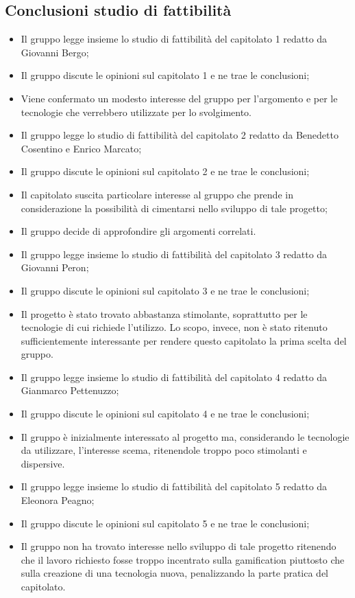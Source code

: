 \documentclass[11pt,a4paper]{article}
\begin{document}
	\subsection{Conclusioni studio di fattibilità}
	\begin{itemize}
	\item Il gruppo legge insieme lo studio di fattibilità del capitolato 1 redatto da Giovanni Bergo;
	\item Il gruppo discute le opinioni sul capitolato 1 e ne trae le conclusioni;
	\item Viene confermato un modesto interesse del gruppo per l’argomento e per le tecnologie che verrebbero utilizzate per lo svolgimento.
	\item Il gruppo legge lo studio di fattibilità del capitolato 2 redatto da Benedetto Cosentino e Enrico Marcato;
	\item Il gruppo discute le opinioni sul capitolato 2 e ne trae le conclusioni;
	\item Il capitolato suscita particolare interesse al gruppo che prende in considerazione la possibilità di cimentarsi nello sviluppo di tale progetto;
	\item Il gruppo decide di approfondire gli argomenti correlati.
	\item Il gruppo legge insieme lo studio di fattibilità del capitolato 3 redatto da Giovanni Peron;
	\item Il gruppo discute le opinioni sul capitolato 3 e ne trae le conclusioni;
	\item Il progetto è stato trovato abbastanza stimolante, soprattutto per le tecnologie di cui richiede l’utilizzo. Lo scopo, invece, non è stato ritenuto sufficientemente interessante per rendere questo capitolato la prima scelta del gruppo. 
	\item Il gruppo legge insieme lo studio di fattibilità del capitolato 4 redatto da Gianmarco Pettenuzzo;
	\item Il gruppo discute le opinioni sul capitolato 4 e ne trae le conclusioni;
	\item Il gruppo è inizialmente interessato al progetto ma, considerando le tecnologie da utilizzare, l’interesse scema, ritenendole troppo poco stimolanti e dispersive.
	\item Il gruppo legge insieme lo studio di fattibilità del capitolato 5 redatto da Eleonora Peagno;
	\item Il gruppo discute le opinioni sul capitolato 5 e ne trae le conclusioni;
	\item Il gruppo non ha trovato interesse nello sviluppo di tale progetto ritenendo che il lavoro richiesto fosse troppo incentrato sulla gamification piuttosto che sulla creazione di una tecnologia nuova, penalizzando la parte pratica del capitolato.  

\end{itemize}
\end{document}
